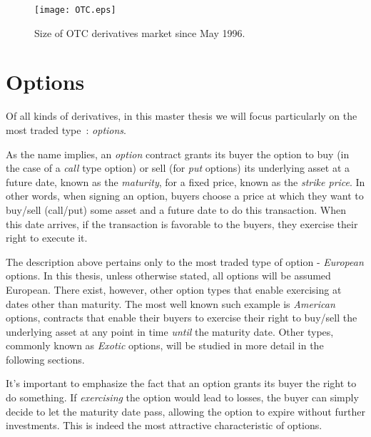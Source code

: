 \begin{figure}[!htb]
    \centering
      \texttt{[image: OTC.eps]}
      \caption{Size of OTC derivatives market since May 1996.}\label{fig:OTC}
    \end{figure}

\section{Options}
\label{section:options}
Of all kinds of derivatives, in this master thesis we will focus particularly on the most traded type~\cite{Hull}: \emph{options}.

As the name implies, an \emph{option} contract grants its buyer the option to buy (in the case of a \emph{call} type option) or sell (for \emph{put} options) its underlying asset at a future date, known as the \emph{maturity}, for a fixed price, known as the \emph{strike price}.
In other words, when signing an option, buyers choose a price at which they want to buy/sell (call/put) some asset and a future date to do this transaction. When this date arrives, if the transaction is favorable to the buyers, they exercise their right to execute it.

The description above pertains only to the most traded type of option - \emph{European} options. In this thesis, unless otherwise stated, all options will be assumed European. There exist, however, other option types that enable exercising at dates other than maturity.
The most well known such example is \emph{American} options, contracts that enable their buyers to exercise their right to buy/sell the underlying asset at any point in time \emph{until} the maturity date.
Other types, commonly known as \emph{Exotic} options, will be studied in more detail in the following sections.


It's important to emphasize the fact that an option grants its buyer the right to do something. If \emph{exercising} the option would lead to losses, the buyer can simply decide to let the maturity date pass, allowing the option to expire without further investments. This is indeed the most attractive characteristic of options.


\iffalse
